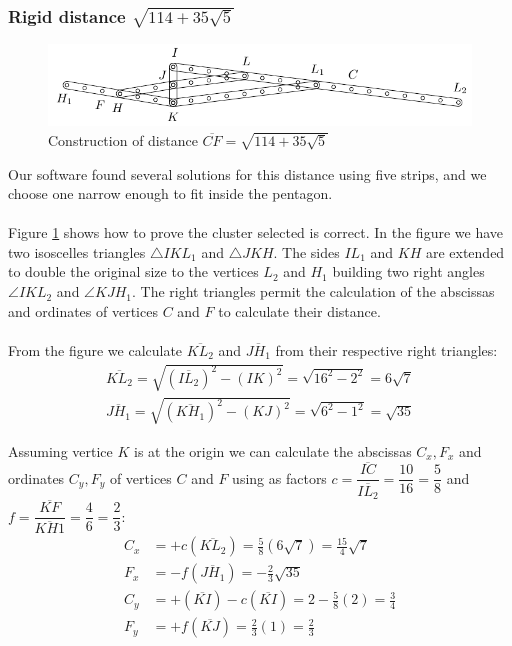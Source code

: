 \documentclass[11pt]{article}
\begin{document}
\subsubsection{Rigid distance $\sqrt{114+35\sqrt5}$}

\begin{figure}[H]
 \centering
 \includegraphics[scale=1.3]{10/cluster10a}
 \caption{Construction of distance $\overline{CF} = \sqrt{114+35\sqrt5}$}
 \label{fig:cluster10a}
\end{figure}

Our software found several solutions for this distance using five strips, and we choose one narrow enough to fit inside the pentagon.
\\\\
Figure \ref{fig:cluster10a} shows how to prove the cluster selected is correct. In the figure we have two isoscelles triangles $\triangle{IKL_1}$ and $\triangle{JKH}$. The sides $IL_1$ and $KH$ are extended to double the original size to the vertices $L_2$ and $H_1$ building two right angles $\angle{IKL_2}$ and $\angle{KJH_1}$. The right triangles permit the calculation of the abscissas and ordinates of vertices $C$ and $F$ to calculate their distance.
\\\\
From the figure we calculate $\overline{KL_2}$ and $\overline{JH_1}$ from their respective right triangles:
\begin{align}
\overline{KL_2} = \sqrt{(\overline{IL_2})^2 - (IK)^2} = \sqrt{16^2 - 2^2} = 6\sqrt7\\
\overline{JH_1} = \sqrt{(\overline{KH_1})^2 - (KJ)^2} = \sqrt{6^2 - 1^2} = \sqrt{35}
\end{align}

Assuming vertice $K$ is at the origin we can calculate the abscissas $C_x,F_x$ and ordinates $C_y,F_y$ of vertices $C$ and $F$ using as factors $c = \dfrac{\overline{IC}}{\overline{IL_2}} = \dfrac{10}{16} = \dfrac{5}8$ and $f = \dfrac{\overline{KF}}{\overline{KH1}}=\dfrac{4}6 = \dfrac{2}3$:
\begin{align}
C_x &= +c(\overline{KL_2}) = \frac{5}{8}(6\sqrt7) = \frac{15}{4}\sqrt7\\
F_x &= -f(\overline{JH_1}) = -\frac{2}{3}\sqrt{35}\\
C_y &= +(\overline{KI}) - c(\overline{KI}) = 2 - \frac{5}{8}(2) = \frac{3}4\\
F_y &= +f(\overline{KJ}) = \frac{2}{3}(1) = \frac{2}3
\end{align}
\end{document}
